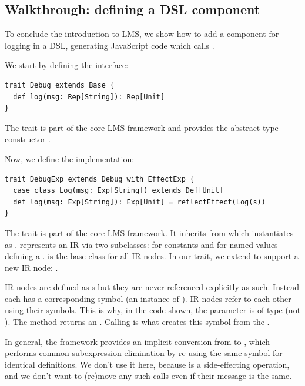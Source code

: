 \documentclass[runningheads,a4paper]{llncs}
\begin{document}
\subsection{Walkthrough: defining a DSL component}\label{sec:defineDslComponent}

To conclude the introduction to LMS, we show how to add a component
for logging in a DSL, generating JavaScript code which calls
.

We start by defining the interface:
\begin{lstlisting}
trait Debug extends Base {
  def log(msg: Rep[String]): Rep[Unit]
}
\end{lstlisting}

The  trait is part of the core LMS framework and provides
the abstract type constructor .

Now, we define the implementation:
\begin{lstlisting}
trait DebugExp extends Debug with EffectExp {
  case class Log(msg: Exp[String]) extends Def[Unit]
  def log(msg: Exp[String]): Exp[Unit] = reflectEffect(Log(s))
}
\end{lstlisting}

The  trait is part of the core LMS framework. It
inherits from  which instantiates  as
.  represents an IR via two subclasses:
 for constants and  for named values defining a
.  is the base class for all IR nodes. In our
 trait, we extend  to support a new IR node:
.

IR nodes are defined as s but they are never referenced
explicitly as such. Instead each  has a corresponding symbol
(an instance of ). IR nodes refer to each other using their
symbols. This is why, in the code shown, the  parameter is
of type  (not ). The method  
returns an . Calling  is what creates
this symbol from the .

In general, the framework provides an implicit conversion from
 to , which performs common subexpression
elimination by re-using the same symbol for identical definitions. We
don't use it here, because  is a side-effecting operation,
and we don't want to (re)move any such calls even if their message
is the same.
\end{document}
